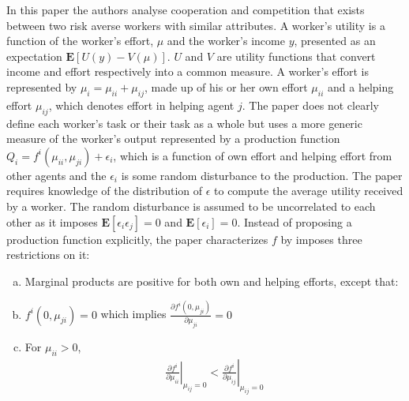 \documentclass[a4paper,10pt]{article}
\theoremstyle{definition}
\begin{document}
In this paper the authors analyse cooperation and competition that exists between two risk averse workers with similar attributes. A worker's utility is a function of the worker's effort, $\mu$ and the worker's income $y$, presented as an expectation $\mathbf{E}[U(y)-V(\mu)]$.
$U$ and $V$ are utility functions that convert income and effort respectively into a common measure. A worker's effort is represented by $\mu_i = \mu_{ii}+\mu_{ij}$, made up of his or her own effort $\mu_{ii}$ and a helping effort $\mu_{ij}$, which denotes effort in helping agent $j$. The paper does not clearly define each worker's task or their task as a whole but uses a more generic measure of the worker's output represented by a production function $Q_i=f^i(\mu_{ii},\mu_{ji})+\epsilon_i$,
which is a function of own effort and helping effort from other agents and the $\epsilon_i$ is some random disturbance to the production. The paper requires knowledge of the distribution of $\epsilon$ to compute the average utility received by a worker. The random disturbance is assumed to be uncorrelated to each other as it imposes $\mathbf{E}[\epsilon_i\epsilon_j]=0$ and $\mathbf{E}[\epsilon_i]=0$. Instead of proposing a production function explicitly, the paper characterizes $f$ by imposes three restrictions on it:



\begin{enumerate}[(a)]
\item Marginal products are positive for both own and helping efforts, except that:
\item $f^i(0,\mu_{ji})=0$ which implies $\frac{\partial f^i(0,\mu_{ji})}{\partial \mu_{ji}}=0$
\item For $\mu_{ii}>0$,
\begin{align*}
\left.\frac{\partial f^i}{\partial \mu_{ii}}\right|_{\mu_{ij}=0} < \left.\frac{\partial f^i}{\partial \mu_{ij}}\right|_{\mu_{ij}=0}
\end{align*}
\end{enumerate}
\end{document}
